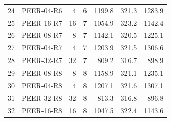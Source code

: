 \begin{longtable}{rrrrrrr}
24 & PEER-04-R6 & 4 & 6 & 1199.8 & 321.3 & 1283.9 \\
25 & PEER-16-R7 & 16 & 7 & 1054.9 & 323.2 & 1142.4 \\
26 & PEER-08-R7 & 8 & 7 & 1142.1 & 320.5 & 1225.1 \\
27 & PEER-04-R7 & 4 & 7 & 1203.9 & 321.5 & 1306.6 \\
28 & PEER-32-R7 & 32 & 7 & 809.2 & 316.7 & 898.9 \\
29 & PEER-08-R8 & 8 & 8 & 1158.9 & 321.1 & 1235.1 \\
30 & PEER-04-R8 & 4 & 8 & 1207.1 & 321.6 & 1307.1 \\
31 & PEER-32-R8 & 32 & 8 & 813.3 & 316.8 & 896.8 \\
32 & PEER-16-R8 & 16 & 8 & 1047.5 & 322.4 & 1143.6 \\
\end{longtable}